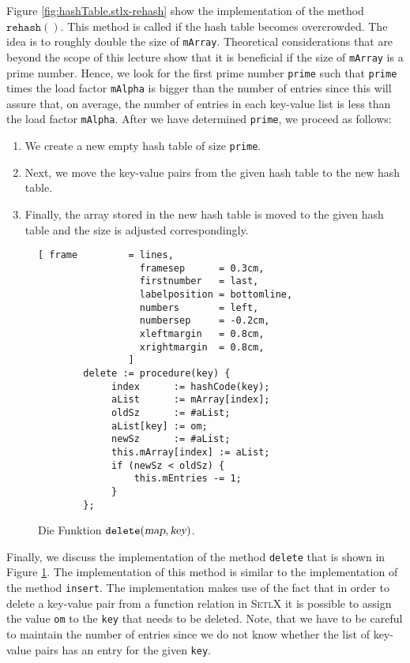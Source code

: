 Figure \ref{fig:hashTable.stlx-rehash} show the implementation of the method
$\mathtt{rehash}()$.  This method is called if the hash table becomes overcrowded.  The idea is to
roughly double the size of \texttt{mArray}.  Theoretical considerations that are  beyond the scope
of this lecture show that it is beneficial if the size of \texttt{mArray} is a prime number.
Hence, we look for the first prime number \texttt{prime} such that \texttt{prime} times the load
factor \texttt{mAlpha} is bigger than the
number of entries since this will assure that, on average, the number of entries in each key-value
list is less than the load factor \texttt{mAlpha}.  After we have determined \texttt{prime}, we
proceed as follows: 
\begin{enumerate}
\item We create a new empty hash table of size \texttt{prime}.
\item Next, we move the key-value pairs from the given hash table to the new hash table.
\item Finally, the array stored in the new hash table is moved to the given hash table
      and the size is adjusted correspondingly.
\end{enumerate}





\begin{figure}[!ht]
\centering
\begin{Verbatim}[ frame         = lines, 
                  framesep      = 0.3cm, 
                  firstnumber   = last,
                  labelposition = bottomline,
                  numbers       = left,
                  numbersep     = -0.2cm,
                  xleftmargin   = 0.8cm,
                  xrightmargin  = 0.8cm,
                ]
        delete := procedure(key) {
             index      := hashCode(key);
             aList      := mArray[index];
             oldSz      := #aList;
             aList[key] := om;
             newSz      := #aList;
             this.mArray[index] := aList;
             if (newSz < oldSz) {
                 this.mEntries -= 1;
             }    
        };
\end{Verbatim}
\vspace*{-0.3cm}
\caption{Die Funktion $\mathtt{delete}(\textsl{map}, \textsl{key})$.}
\label{fig:hashTable.stlx-delete}
\end{figure}

Finally, we discuss the implementation of the method \texttt{delete} that is shown in Figure
\ref{fig:hashTable.stlx-delete}.  The implementation of this method is similar to the implementation
of the method \texttt{insert}.   The implementation makes use of the fact that in order to delete
a key-value pair from a function relation in \textsc{SetlX} it is possible to assign the value
\texttt{om} to the \texttt{key} that needs to be deleted. Note, that we have to be careful to
maintain the number of entries since we do not know whether the list of key-value pairs has an entry
for the given \texttt{key}.

